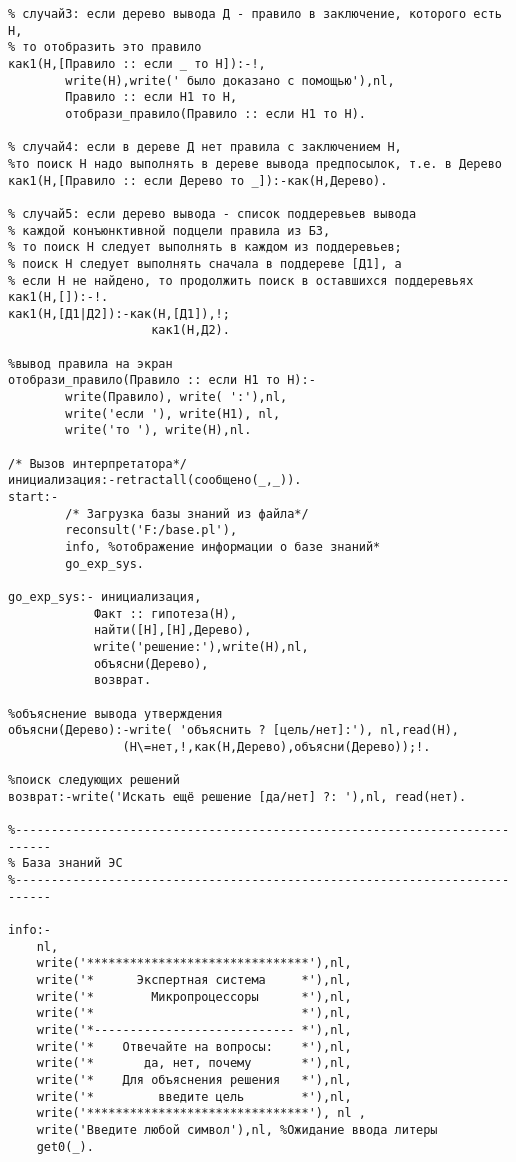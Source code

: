 \documentclass[a4paper,14pt]{extarticle}
\begin{document}
\begin{lstlisting}
% случай3: если дерево вывода Д - правило в заключение, которого есть Н,
% то отобразить это правило
как1(H,[Правило :: если _ то H]):-!, 
		write(H),write(' было доказано с помощью'),nl,
		Правило :: если H1 то H,
		отобрази_правило(Правило :: если H1 то H).
	
% случай4: если в дереве Д нет правила с заключением Н,
%то поиск Н надо выполнять в дереве вывода предпосылок, т.е. в Дерево
как1(H,[Правило :: если Дерево то _]):-как(H,Дерево). 

% случай5: если дерево вывода - список поддеревьев вывода 
% каждой конъюнктивной подцели правила из БЗ, 
% то поиск Н следует выполнять в каждом из поддеревьев;
% поиск Н следует выполнять сначала в поддереве [Д1], а
% если Н не найдено, то продолжить поиск в оставшихся поддеревьях
как1(H,[]):-!.
как1(H,[Д1|Д2]):-как(H,[Д1]),!;
					как1(H,Д2).
					
%вывод правила на экран
отобрази_правило(Правило :: если H1 то H):-
		write(Правило), write( ':'),nl,
		write('если '), write(H1), nl,
		write('то '), write(H),nl.
		
/* Вызов интерпретатора*/
инициализация:-retractall(сообщено(_,_)).
start:-
		/* Загрузка базы знаний из файла*/
		reconsult('F:/base.pl'),
		info, %отображение информации о базе знаний*
		go_exp_sys. 
		
go_exp_sys:- инициализация,
			Факт :: гипотеза(H),
			найти([H],[H],Дерево), 
			write('решение:'),write(H),nl,
			объясни(Дерево),
			возврат.
			
%объяснение вывода утверждения
объясни(Дерево):-write( 'объяснить ? [цель/нет]:'), nl,read(H), 
				(H\=нет,!,как(H,Дерево),объясни(Дерево));!.
	
%поиск следующих решений
возврат:-write('Искать ещё решение [да/нет] ?: '),nl, read(нет).

%---------------------------------------------------------------------------
% База знаний ЭС
%---------------------------------------------------------------------------

info:-
	nl,
	write('*******************************'),nl,
	write('*      Экспертная система     *'),nl,
	write('*        Микропроцессоры      *'),nl,
	write('*                             *'),nl,
	write('*---------------------------- *'),nl,
	write('*    Отвечайте на вопросы:    *'),nl,
	write('*       да, нет, почему       *'),nl,
	write('*    Для объяснения решения   *'),nl,
	write('*         введите цель        *'),nl,
	write('*******************************'), nl ,
	write('Введите любой символ'),nl, %Ожидание ввода литеры
	get0(_).
	

\end{lstlisting}
\end{document}
